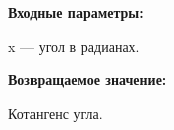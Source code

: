 \textbf{Входные параметры:}

 x --- угол в радианах.

\textbf{Возвращаемое значение:}

Котангенс угла.